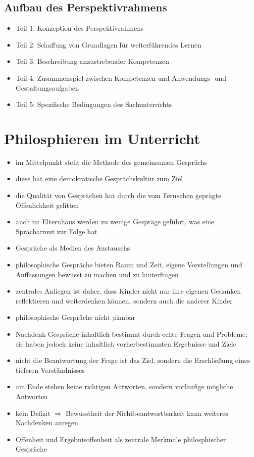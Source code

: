 {{{\begin{itemize}
\end{itemize}

\subsection{Aufbau des Perspektivrahmens}

\begin{itemize}
	\item{Teil 1: Konzeption des Perspektivrahmens}
	\item{Teil 2: Schaffung von Grundlagen für weiterführendes Lernen}
	\item{Teil 3: Beschreibung anzustrebender Kompetenzen}
	\item{Teil 4: Zusammenspiel zwischen Kompetenzen und Anwendungs- und Gestaltungsaufgaben}
	\item{Teil 5: Spezifische Bedingungen des Sachunterrichts}


\end{itemize}

\newpage

\section{Philosphieren im Unterricht} {\cite{KM06}}

\begin{itemize}
	\item{im Mittelpunkt steht die Methode des gemeinsamen Gesprächs}
	\item{diese hat eine demokratische Gesprächskultur zum Ziel}
	\item{die Qualität von Gesprächen hat durch die vom Fernsehen geprägte Öffenlichkeit gelitten}
	\item{auch im Elternhaus werden zu wenige Gespräge geführt, was eine Spracharmut zur Folge hat}
	\item{Gespräche als Medien des Austauschs}
	\item{philosophische Gespräche bieten Raum und Zeit, eigene Vorstellungen und Auffassungen bewusst zu machen und zu hinterfragen}
	\item{zentrales Anliegen ist daher, dass Kinder nicht nur ihre eigenen Gedanken reflektieren und weiterdenken können, sondern auch die anderer Kinder}
	\item{philosophische Gespräche nicht planbar}
	\item{Nachdenk-Gespräche inhaltlich bestimmt durch echte Fragen und Probleme; sie haben jedoch keine inhaltlich vorherbestimmten Ergebnisse und Ziele}
	\item{nicht die Beantwortung der Frage ist das Ziel, sondern die Erschließung eines tieferen Verständnisses}
	\item{am Ende stehen keine richtigen Antworten, sondern vorläufige mögliche Antworten}
	\item{kein Defizit $\Rightarrow$ Bewusstheit der Nichtbeantwortbarkeit kann weiteres Nachdenken anregen}
	\item{Offenheit und Ergebnisoffenheit als zentrale Merkmale philosphischer Gespräche}


\end{itemize}}}}
